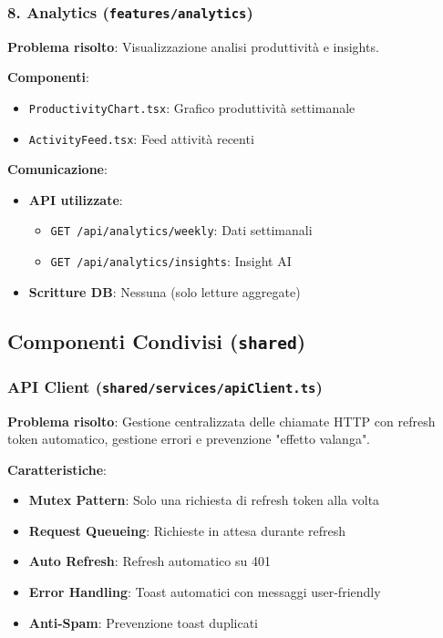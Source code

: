 \documentclass[11pt,a4paper]{article}
\begin{document}
\subsubsection{8. Analytics (\texttt{features/analytics})}

\textbf{Problema risolto}: Visualizzazione analisi produttività e insights.

\textbf{Componenti}:
\begin{itemize}
    \item \texttt{ProductivityChart.tsx}: Grafico produttività settimanale
    \item \texttt{ActivityFeed.tsx}: Feed attività recenti
\end{itemize}

\textbf{Comunicazione}:
\begin{itemize}
    \item \textbf{API utilizzate}: 
    \begin{itemize}
        \item \texttt{GET /api/analytics/weekly}: Dati settimanali
        \item \texttt{GET /api/analytics/insights}: Insight AI
    \end{itemize}
    \item \textbf{Scritture DB}: Nessuna (solo letture aggregate)
\end{itemize}

\subsection{Componenti Condivisi (\texttt{shared})}

\subsubsection{API Client (\texttt{shared/services/apiClient.ts})}

\textbf{Problema risolto}: Gestione centralizzata delle chiamate HTTP con refresh token automatico, gestione errori e prevenzione "effetto valanga".

\textbf{Caratteristiche}:
\begin{itemize}
    \item \textbf{Mutex Pattern}: Solo una richiesta di refresh token alla volta
    \item \textbf{Request Queueing}: Richieste in attesa durante refresh
    \item \textbf{Auto Refresh}: Refresh automatico su 401
    \item \textbf{Error Handling}: Toast automatici con messaggi user-friendly
    \item \textbf{Anti-Spam}: Prevenzione toast duplicati
\end{itemize}
\end{document}
